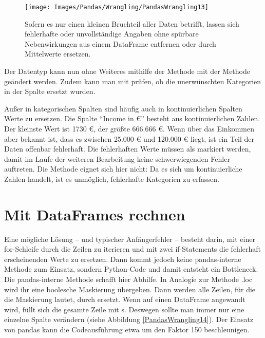 \begin{figure}
    \centering
    \texttt{[image: Images/Pandas/Wrangling/PandasWrangling13]}    
    \caption{Sofern es nur einen kleinen Bruchteil aller Daten betrifft, lassen sich fehlerhafte oder unvollständige Angaben ohne spürbare Nebenwirkungen aus einem DataFrame entfernen oder durch Mittelwerte ersetzen.} \label{PandasWrangling13}
\end{figure}


Der Datentyp kann nun ohne Weiteres mithilfe der Methode mit der Methode  geändert werden. Zudem kann man mit  prüfen, ob die unerwünschten Kategorien in der Spalte  ersetzt wurden.

Außer in kategorischen Spalten sind häufig auch in kontinuierlichen Spalten Werte zu ersetzen. Die Spalte ``Income in \euro{}'' besteht aus kontinuierlichen Zahlen. Der kleinste Wert ist  1730 \euro{}, der größte 666.666 \euro{}. Wenn über das Einkommen aber bekannt ist, dass es zwischen 25.000 \euro{} und 120.000 \euro{} liegt, ist ein Teil der Daten offenbar fehlerhaft. Die fehlerhaften Werte müssen als  markiert werden, damit im Laufe der weiteren Bearbeitung keine schwerwiegenden Fehler auftreten. Die Methode  eignet sich hier nicht: Da es sich um kontinuierliche Zahlen handelt, ist es unmöglich, fehlerhafte Kategorien zu erfassen.

\section{Mit DataFrames rechnen}

Eine mögliche Lösung -- und typischer Anfängerfehler -- besteht darin, mit einer for-Schleife durch die Zeilen zu iterieren und mit zwei if-Statements die fehlerhaft erscheinenden Werte zu ersetzen. Dann kommt jedoch keine pandas-interne Methode zum Einsatz, sondern Python-Code  und damit entsteht ein Bottleneck. Die pandas-interne Methode  schafft hier Abhilfe. In Analogie zur Methode .loc wird ihr eine boolesche Maskierung übergeben. Dann werden alle Zeilen, für die die Maskierung  lautet, durch  ersetzt. Wenn  auf einen DataFrame angewandt wird, füllt sich die gesamte Zeile mit s. Deswegen sollte man immer nur eine einzelne Spalte verändern (siehe Abbildung \ref{PandasWrangling14}). Der Einsatz von pandas kann die Codeausführung etwa um den Faktor 150 beschleunigen.

